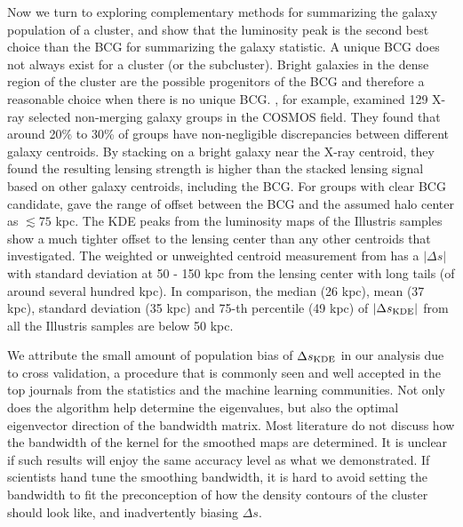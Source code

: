 Now we turn to exploring complementary methods for summarizing
the galaxy population of a cluster, and show that  the luminosity peak 
is the second best choice than the BCG for summarizing the galaxy statistic.
A unique BCG does not always exist for a cluster (or the subcluster).   
Bright galaxies in the dense region of the cluster are the possible progenitors 
of the BCG and therefore a reasonable choice when there is no unique BCG. 
\cite{George2012a}, for example, examined 129 X-ray selected non-merging galaxy 
groups in the COSMOS field.
They found that around 20\% to 30\% of groups have non-negligible discrepancies
between different galaxy centroids. 
By stacking on a bright galaxy near the X-ray centroid, they found  
the resulting lensing strength is higher than the stacked lensing signal based
on other galaxy centroids, including the BCG. 
For groups with clear BCG candidate, \cite{George2012a} gave the range of
offset between the BCG and the assumed halo center as $\lesssim 75$ kpc. 
The KDE peaks from the luminosity maps of the Illustris samples show a much 
tighter offset to the 
lensing center than any other centroids that \cite{George2012a} investigated. 
The weighted or unweighted centroid measurement from \cite{George2012a} has a 
$|\Delta s|$ with standard deviation at 50 - 150 kpc from the
lensing center with long tails (of around several hundred kpc). 
In comparison, the median (26 kpc), mean (37 kpc), standard deviation (35 kpc) 
and 75-th percentile (49 kpc) of 
$|\Delta s_{\rm KDE}|$ from all the Illustris samples are below 50 kpc. 

We attribute the small amount of population bias of $\Delta s_{\rm KDE}$ in our
analysis due 
to cross validation, a procedure that is commonly seen and well accepted 
in the top journals 
from the statistics and the machine learning communities. 
Not only does the algorithm help
determine the eigenvalues, but also the optimal eigenvector direction of 
the bandwidth matrix. 
Most literature do not discuss how the bandwidth of 
the kernel for the smoothed maps are determined.  
It is unclear if such results will enjoy the same accuracy level as what
we demonstrated. 
If scientists hand tune the smoothing bandwidth, it is hard to
avoid setting the bandwidth to fit the preconception of how the density
contours of the cluster 
should look like, and inadvertently biasing $\Delta s$.

